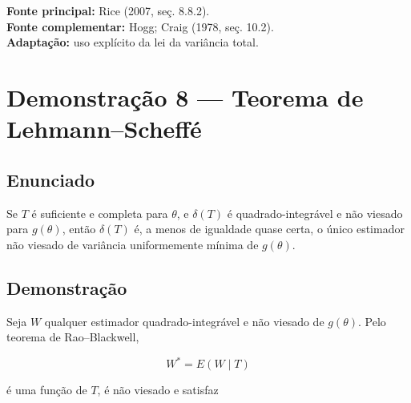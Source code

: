 \documentclass[
  letterpaper,
  DIV=11,
  numbers=noendperiod]{scrreprt}
\begin{document}
\begin{tcolorbox}[enhanced jigsaw, colback=white, leftrule=.75mm, colbacktitle=quarto-callout-note-color!10!white, breakable, titlerule=0mm, bottomtitle=1mm, title=\textcolor{quarto-callout-note-color}{\faInfo}\hspace{0.5em}{Fonte da demonstração}, colframe=quarto-callout-note-color-frame, toprule=.15mm, opacityback=0, bottomrule=.15mm, opacitybacktitle=0.6, arc=.35mm, toptitle=1mm, rightrule=.15mm, coltitle=black, left=2mm]

\textbf{Fonte principal:} Rice (2007, seç. 8.8.2).\\
\textbf{Fonte complementar:} Hogg; Craig (1978, seç. 10.2).\\
\textbf{Adaptação:} uso explícito da lei da variância total.

\end{tcolorbox}

\section*{Demonstração 8 --- Teorema de
Lehmann--Scheffé}\label{demonstrauxe7uxe3o-8-teorema-de-lehmannscheffuxe9}


\subsection*{Enunciado}\label{enunciado-7}

Se \(T\) é suficiente e completa para \(\theta\), e \(\delta(T)\) é
quadrado-integrável e não viesado para \(g(\theta)\), então
\(\delta(T)\) é, a menos de igualdade quase certa, o único estimador não
viesado de variância uniformemente mínima de \(g(\theta)\).

\subsection*{Demonstração}\label{demonstrauxe7uxe3o-8}

Seja \(W\) qualquer estimador quadrado-integrável e não viesado de
\(g(\theta)\). Pelo teorema de Rao--Blackwell,

\[
W^*=E(W\mid T)
\]

é uma função de \(T\), é não viesado e satisfaz
\end{document}
